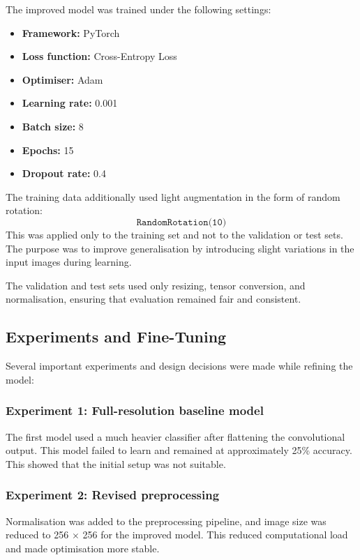 \documentclass{article}
\begin{document}
The improved model was trained under the following settings:

\begin{itemize}
    \item \textbf{Framework:} PyTorch
    \item \textbf{Loss function:} Cross-Entropy Loss
    \item \textbf{Optimiser:} Adam
    \item \textbf{Learning rate:} 0.001
    \item \textbf{Batch size:} 8
    \item \textbf{Epochs:} 15
    \item \textbf{Dropout rate:} 0.4
\end{itemize}

The training data additionally used light augmentation in the form of random rotation:
\[
\texttt{RandomRotation(10)}
\]
This was applied only to the training set and not to the validation or test sets. The purpose was to improve generalisation by introducing slight variations in the input images during learning.

The validation and test sets used only resizing, tensor conversion, and normalisation, ensuring that evaluation remained fair and consistent.

\subsection{Experiments and Fine-Tuning}

Several important experiments and design decisions were made while refining the model:

\subsubsection{Experiment 1: Full-resolution baseline model}
The first model used a much heavier classifier after flattening the convolutional output. This model failed to learn and remained at approximately 25\% accuracy. This showed that the initial setup was not suitable.

\subsubsection{Experiment 2: Revised preprocessing}
Normalisation was added to the preprocessing pipeline, and image size was reduced to 256 $\times$ 256 for the improved model. This reduced computational load and made optimisation more stable.
\end{document}
